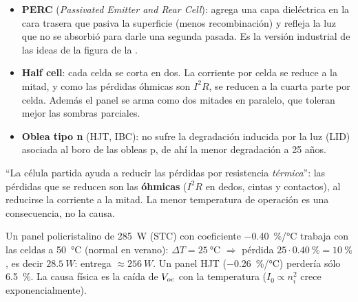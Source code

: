 \begin{itemize}
  \item \textbf{PERC} (\emph{Passivated Emitter and Rear Cell}): agrega una capa dieléctrica
  en la cara trasera que pasiva la superficie (menos recombinación) y refleja la luz que no
  se absorbió para darle una segunda pasada. Es la versión industrial de las ideas de
  la figura de la .
  \item \textbf{Half cell}: cada celda se corta en dos. La corriente por celda se reduce a la
  mitad, y como las pérdidas óhmicas son $I^2R$, se reducen a la cuarta parte por celda.
  Además el panel se arma como dos mitades en paralelo, que toleran mejor las sombras
  parciales.
  \item \textbf{Oblea tipo n} (HJT, IBC): no sufre la degradación inducida por la luz
  (LID) asociada al boro de las obleas p, de ahí la menor degradación a 25 años.
\end{itemize}

\begin{ojo}[\diapo{38}]
``La célula partida ayuda a reducir las pérdidas por resistencia \emph{térmica}'': las
pérdidas que se reducen son las \textbf{óhmicas} ($I^2R$ en dedos, cintas y contactos), al
reducirse la corriente a la mitad. La menor temperatura de operación es una consecuencia,
no la causa.
\end{ojo}

\begin{ejemplo}
Un panel policristalino de \SI{285}{W} (STC) con coeficiente \SI{-0.40}{\percent/\celsius}
trabaja con las celdas a \SI{50}{\celsius} (normal en verano):
$\Delta T=\SI{25}{\celsius}$ $\Rightarrow$ pérdida $25\cdot\SI{0.40}{\percent}=\SI{10}{\percent}$,
es decir $\SI{28.5}{W}$: entrega $\approx\SI{256}{W}$. Un panel HJT
(\SI{-0.26}{\percent/\celsius}) perdería sólo \SI{6.5}{\percent}. La causa física es la
caída de $V_{oc}$ con la temperatura ($I_0\propto n_i^2$ crece exponencialmente).
\end{ejemplo}
